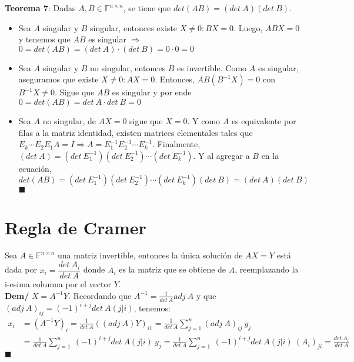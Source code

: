 \documentclass[11pt,a4paper]{article}
\newcommand*{\QEDA}{\null\nobreak\hfill\ensuremath{\blacksquare}}
\begin{document}
\textbf{Teorema 7}: Dadas $A,B \in \mathbb{F}^{n \times n}$, se tiene que $det(AB) = (det\ A)(det\ B)$.
\begin{itemize}
\itemsep-0.3em
\item Sea $A$ singular y $B$ singular, entonces existe $X \not = 0 : BX=0$. Luego, $ABX=0$ y tenemos que $AB$ es singular $\Rightarrow$ $0 = det(AB) = (det\ A) \cdot (det\ B) = 0 \cdot 0 = 0$
\item Sea $A$ singular y $B$ no singular, entonces $B$ es invertible. Como $A$ es singular, aseguramos que existe $X \not = 0 : AX=0$. Entonces, $AB(B^{-1}X) = 0$ con $B^{-1}X \not = 0$. Sigue que $AB$ es singular y por ende $0 = det(AB) = det\ A \cdot det\ B = 0$
\item Sea $A$ no singular, de $AX=0$ sigue que $X=0$. Y como $A$ es equivalente por filas a la matriz identidad, existen matrices elementales tales que $E_k \cdots E_2E_1A = I \Rightarrow A = E_1^{-1}E_2^{-1}\cdots E_k^{-1}$. Finalmente, $(det\ A) = (det\ E_1^{-1})(det\ E_2^{-1})\cdots (det\ E_k^{-1})$. Y al agregar a $B$ en la ecuaci\'on, $det(AB) = (det\ E_1^{-1})(det\ E_2^{-1})\cdots (det\ E_k^{-1})(det\ B) = (det\ A)(det\ B)$ \QEDA
\end{itemize}

\section{Regla de Cramer}
Sea $A \in \mathbb{F}^{n \times n}$ una matriz invertible, entonces la \'unica soluci\'on de $AX=Y$ est\'a dada por $x_i = \dfrac{det\ A_i}{det\ A}$
donde $A_i$ es la matriz que se obtiene de $A$, reemplazando la i-esima columna por el vector $Y$.\\
\textbf{Dem/} $X = A^{-1}Y$. Recordando que $A^{-1} = \frac{1}{det\ A} adj\ A$ y que $(adj\ A)_{ij} = (-1)^{i+j}det\ A(j|i)$, tenemos:
\begin{align*}
x_i 
&= (A^{-1}Y)_i 
= \frac{1}{det\ A} ((adj\ A)Y)_{i1} 
= \frac{1}{det\ A} \sum_{j=1}^n (adj\ A)_{ij}\ y_{j}\\
&= \frac{1}{det\ A} \sum_{j=1}^n\ (-1)^{i+j}det\ A(j|i)\ y_{j}
= \frac{1}{det\ A} \sum_{j=1}^n\ (-1)^{i+j}det\ A(j|i)\ (A_i)_{ji} = \frac{det\ A_i}{det\ A}
\end{align*}
\QEDA
\end{document}
